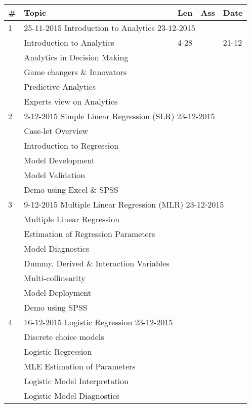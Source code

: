 \documentclass[a4paper,12pt]{article} %
\begin{document}
\begin{longtable}{|l|p{11cm}|l|l|l|}
		\hline
		\# & Topic & Len & Ass & Date \\
		\hline
		1 & \multicolumn{4}{|l|}{25-11-2015 \hfill Introduction to Analytics \hfill 23-12-2015}\\
		\hline
		& Introduction to Analytics & 4-28 & & 21-12 \\
		\hline
		& Analytics in Decision Making & & & \\
		\hline
		& Game changers \& Innovators & & & \\
		\hline
		& Predictive Analytics & & & \\
		\hline
		& Experts view on Analytics & & & \\
		\hline
		2 & \multicolumn{4}{|l|}{2-12-2015 \hfill Simple Linear Regression (SLR) \hfill 23-12-2015}\\
		\hline
		& Case-let Overview & & & \\
		\hline
		& Introduction to Regression & & & \\
		\hline
		& Model Development & & & \\
		\hline
		& Model Validation & & & \\
		\hline
		& Demo using Excel \& SPSS & & & \\
		\hline
		3 & \multicolumn{4}{|l|}{9-12-2015 \hfill Multiple Linear Regression (MLR) \hfill 23-12-2015}\\
		\hline
		& Multiple Linear Regression & & & \\
		\hline
		& Estimation of Regression Parameters & & & \\
		\hline
		& Model Diagnostics & & & \\
		\hline
		& Dummy, Derived \& Interaction Variables & & & \\
		\hline
		& Multi-collinearity & & & \\
		\hline
		& Model Deployment & & & \\
		\hline
		& Demo using SPSS & & & \\
		\hline
		4 & \multicolumn{4}{|l|}{16-12-2015 \hfill Logistic Regression \hfill 23-12-2015}\\
		\hline
		& Discrete choice models & & & \\
		\hline
		& Logistic Regression & & & \\
		\hline
		& MLE Estimation of Parameters & & & \\
		\hline
		& Logistic Model Interpretation & & & \\
		\hline
		& Logistic Model Diagnostics & & & \\

\end{longtable}
\end{document}
